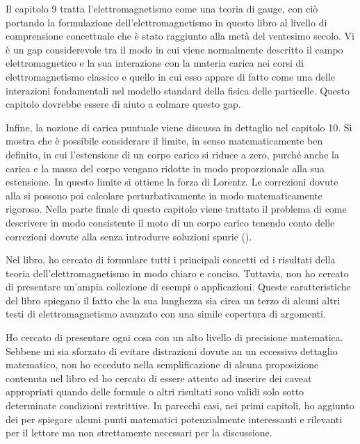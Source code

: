Il capitolo 9 tratta l'elettromagnetismo come una teoria di gauge, con ciò portando la formulazione dell'elettromagnetismo in questo libro al livello di comprensione concettuale che è stato raggiunto alla metà del ventesimo secolo. Vi è un gap considerevole tra il modo in cui viene normalmente descritto il campo elettromagnetico e la sua interazione con la materia carica nei corsi di elettromagnetismo classico e quello in cui esso appare di fatto come una delle interazioni fondamentali nel modello standard della fisica delle particelle. Questo capitolo dovrebbe essere di aiuto a colmare questo gap.    

Infine, la nozione di carica puntuale viene discussa in dettaglio nel capitolo 10. Si mostra che è possibile considerare il limite, in senso matematicamente ben definito, in cui l'estensione di un corpo carico si riduce a zero, purché anche la carica e la massa del corpo vengano ridotte in modo proporzionale alla sua estensione. In questo limite si ottiene la forza di Lorentz. Le correzioni dovute alla  si possono poi calcolare perturbativamente in modo matematicamente rigoroso. Nella parte finale di questo capitolo viene trattato il problema di come descrivere in modo consistente il moto di un corpo carico tenendo conto delle correzioni dovute alla  senza introdurre soluzioni spurie ().

Nel libro, ho cercato di formulare tutti i principali concetti ed i risultati della teoria dell'elettromagnetismo in modo chiaro e conciso. Tuttavia, non ho cercato di presentare un'ampia collezione di esempi o applicazioni. Queste caratteristiche del libro spiegano il fatto che la sua lunghezza sia circa un terzo di alcuni altri testi di elettromagnetismo avanzato con una simile copertura di argomenti. 

Ho cercato di presentare ogni cosa con un alto livello di precisione matematica. Sebbene mi sia sforzato di evitare distrazioni dovute an un eccessivo dettaglio matematico, non ho ecceduto nella semplificazione di alcuna proposizione contenuta nel libro ed ho cercato di essere attento ad inserire dei caveat appropriati quando delle formule o altri risultati sono validi solo sotto determinate condizioni restrittive. In parecchi casi, nei primi capitoli, ho aggiunto dei  per spiegare alcuni punti matematici potenzialmente interessanti e rilevanti per il lettore ma non strettamente necessari per la discussione.

